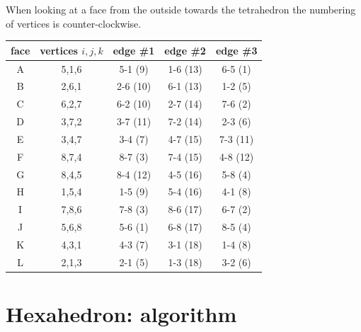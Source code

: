 When looking at a face from the outside towards the tetrahedron the numbering 
of vertices is counter-clockwise.
\begin{center}
\begin{tabular}{ccccc}
\hline
face & vertices $i,j,k$ & edge \#1 & edge \#2 & edge \#3 \\
\hline\hline
A& 5,1,6 & 5-1 ({\color{purple}9})  & 1-6 ({\color{purple}13})  & 6-5 ({\color{purple}1})  \\
B& 2,6,1 & 2-6 ({\color{purple}10}) & 6-1 ({\color{purple}13})  & 1-2 ({\color{purple}5})  \\
C& 6,2,7 & 6-2 ({\color{purple}10}) & 2-7 ({\color{purple}14})  & 7-6 ({\color{purple}2})  \\
D& 3,7,2 & 3-7 ({\color{purple}11}) & 7-2 ({\color{purple}14})  & 2-3 ({\color{purple}6})  \\
E& 3,4,7 & 3-4 ({\color{purple}7})  & 4-7 ({\color{purple}15})  & 7-3 ({\color{purple}11}) \\
F& 8,7,4 & 8-7 ({\color{purple}3})  & 7-4 ({\color{purple}15})  & 4-8 ({\color{purple}12}) \\
G& 8,4,5 & 8-4 ({\color{purple}12}) & 4-5 ({\color{purple}16})  & 5-8 ({\color{purple}4})  \\
H& 1,5,4 & 1-5 ({\color{purple}9})  & 5-4 ({\color{purple}16})  & 4-1 ({\color{purple}8})  \\
I& 7,8,6 & 7-8 ({\color{purple}3})  & 8-6 ({\color{purple}17})  & 6-7 ({\color{purple}2})  \\
J& 5,6,8 & 5-6 ({\color{purple}1})  & 6-8 ({\color{purple}17})  & 8-5 ({\color{purple}4})  \\
K& 4,3,1 & 4-3 ({\color{purple}7})  & 3-1 ({\color{purple}18})  & 1-4 ({\color{purple}8})  \\
L& 2,1,3 & 2-1 ({\color{purple}5})  & 1-3 ({\color{purple}18})  & 3-2 ({\color{purple}6})  \\
\hline
\end{tabular}
\end{center}


\section*{Hexahedron: algorithm}

